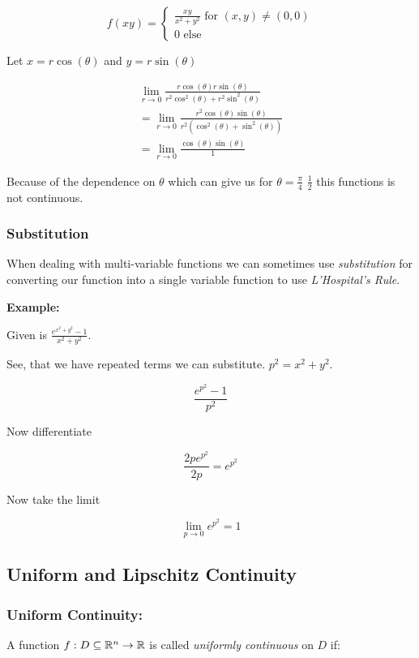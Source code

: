 \[
    f(xy) = 
    \begin{cases}   
    \frac{xy}{x^2 + y^2} \text{ for } (x,y) \ne (0,0) \\ 
    0 \text{ else }
    \end{cases}
\]

Let \(x = r\cos(\theta)\) and \(y = r\sin(\theta)\)

\begin{align*}
    \lim_{r \to 0} \frac{r\cos(\theta)r\sin(\theta)}{r^2\cos^2(\theta) + r^2\sin^2(\theta)}\\
    = \lim_{r \to 0} \frac{r^2\cos(\theta)\sin(\theta)}{r^2(\cos^2(\theta) + \sin^2(\theta))}\\
    = \lim_{r \to 0} \frac{\cos(\theta)\sin(\theta)}{1}
\end{align*}

Because of the dependence on \(\theta\) which can give us for \(\theta = \frac{\pi}{4}\) \(\frac{1}{2}\) 
this functions is not continuous.

\subsubsection{Substitution}

When dealing with multi-variable functions we can sometimes use \emph{substitution} 
for converting our function into a single variable function to use \emph{L'Hospital's Rule}.
\vspace{\baselineskip}

\textbf{Example:}
\vspace{\baselineskip}

Given is \(\frac{e^{x^2 + y^2} - 1}{x^2 + y^2}\).
\vspace{\baselineskip}

See, that we have repeated terms we can substitute. \(p^2 = x^2 + y^2\).

\[
    \frac{e^{p^2} - 1}{p^2}
\]

Now differentiate

\[
    \frac{2p e^{p^2} }{2p} = e^{p^2}
\]

Now take the limit

\[
    \lim_{p \to 0} e^{p^2} = 1
\]

\subsection{Uniform and Lipschitz Continuity}

\subsubsection{Uniform Continuity:}  
A function \( f : D \subseteq \mathbb{R}^n \to \mathbb{R} \) is called \emph{uniformly continuous} on 
\( D \) if:

